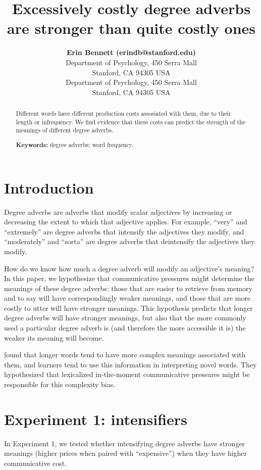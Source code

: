 \documentclass[10pt,letterpaper]{article}
\title{Excessively costly degree adverbs are stronger than quite costly ones}
\author{
{\large \bf Erin Bennett (erindb@stanford.edu)} \\
  Department of Psychology, 450 Serra Mall \\
  Stanford, CA 94305 USA
  \AND {\large \bf Noah D. Goodman (ngoodman@stanford.edu)} \\
  Department of Psychology, 450 Serra Mall \\
  Stanford, CA 94305 USA
  }
\begin{document}
\maketitle

\begin{abstract}
Different words have different production costs assosiated with them, due to their length or infrequency. We find evidence that these costs can predict the strength of the meanings of different degree adverbs.

\textbf{Keywords:} 
degree adverbs; word frequency.
\end{abstract}

\section{Introduction}

Degree adverbs are adverbs that modify scalar adjectives by increasing or decreasing the extent to which that adjective applies. For example, ``very'' and ``extremely'' are degree adverbs that intensify the adjectives they modify, and ``moderately'' and ``sorta'' are degree adverbs that deintensify the adjectives they modify.

How do we know how much a degree adverb will modify an adjective's meaning? In this paper, we hypothesize that communicative pressures might determine the meanings of these degree adverbs: those that are easier to retrieve from memory and to say will have correspondingly weaker meanings, and those that are more costly to utter will have stronger meanings. This hypothesis predicts that longer degree adverbs will have stronger meanings, but also that the more commonly used a particular degree adverb is (and therefore the more accessible it is) the weaker its meaning will become.

 found that longer words tend to have more complex meanings associated with them, and learners tend to use this information in interpreting novel words. They hypothesized that lexicalized in-the-moment communicative pressures might be responsible for this complexity bias.

\section{Experiment 1: intensifiers}

  In Experiment 1, we tested whether intensifying degree adverbs have stronger meanings (higher prices when paired with ``expensive'') when they have higher communicative cost.
  
\end{document}
